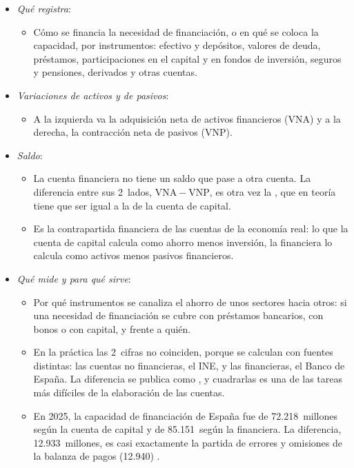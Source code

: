 \documentclass[11pt]{article}
\begin{document}
\begin{itemize}
\item \emph{Qué registra}:
  \begin{itemize}
  \item Cómo se financia la necesidad de financiación, o en qué se coloca la capacidad, por instrumentos: efectivo y depósitos, valores de deuda, préstamos, participaciones en el capital y en fondos de inversión, seguros y pensiones, derivados y otras cuentas.
  \end{itemize}
\item \emph{Variaciones de activos y de pasivos}:
  \begin{itemize}
  \item A la izquierda va la adquisición neta de activos financieros ($\mathrm{VNA}$) y a la derecha, la contracción neta de pasivos ($\mathrm{VNP}$).
  \end{itemize}
\item \emph{Saldo}:
  \begin{itemize}
  \item La cuenta financiera no tiene un saldo que pase a otra cuenta. La diferencia entre sus 2~lados, $\mathrm{VNA}-\mathrm{VNP}$, es otra vez la , que en teoría tiene que ser igual a la de la cuenta de capital\nocite{SEC2010}.
  \item Es la contrapartida financiera de las cuentas de la economía real: lo que la cuenta de capital calcula como ahorro menos inversión, la financiera lo calcula como activos menos pasivos financieros.
  \end{itemize}
\item \emph{Qué mide y para qué sirve}:
  \begin{itemize}
  \item Por qué instrumentos se canaliza el ahorro de unos sectores hacia otros: si una necesidad de financiación se cubre con préstamos bancarios, con bonos o con capital, y frente a quién.
  \item En la práctica las 2~cifras no coinciden, porque se calculan con fuentes distintas: las cuentas no financieras, el INE, y las financieras, el Banco de España. La diferencia se publica como , y cuadrarlas es una de las tareas más difíciles de la elaboración de las cuentas.
  \item En 2025, la capacidad de financiación de España fue de 72.218~millones según la cuenta de capital y de 85.151~según la financiera. La diferencia, 12.933~millones, es casi exactamente la partida de errores y omisiones de la balanza de pagos (12.940)\nocite{Eurostat2026nasa10nftr,Eurostat2026nasa10ftr} .
  \end{itemize}
\end{itemize}
\end{document}

